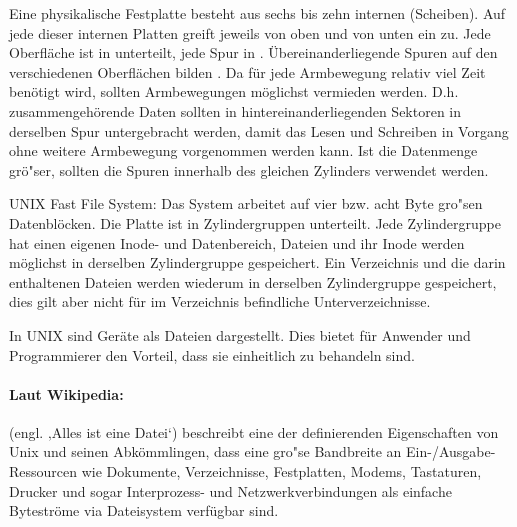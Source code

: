 \begin{answer}
  Eine physikalische Festplatte besteht aus sechs bis zehn internen  (Scheiben). Auf jede
  dieser internen Platten greift jeweils von oben und von unten ein  zu. Jede
  Oberfläche ist in  unterteilt, jede Spur in . Übereinanderliegende Spuren auf den
  verschiedenen Oberflächen bilden . Da für jede Armbewegung relativ viel Zeit benötigt
  wird, sollten Armbewegungen möglichst vermieden werden. D.h. zusammengehörende Daten sollten
  in hintereinanderliegenden Sektoren in derselben Spur untergebracht werden, damit das Lesen
  und Schreiben in Vorgang ohne weitere Armbewegung vorgenommen werden kann. Ist die Datenmenge
  grö"ser, sollten die Spuren innerhalb des gleichen Zylinders verwendet werden.

  UNIX Fast File System:
  Das System arbeitet auf vier bzw. acht Byte gro"sen Datenblöcken. Die Platte ist in Zylindergruppen unterteilt. Jede Zylindergruppe hat einen eigenen Inode- und Datenbereich, Dateien und ihr Inode werden möglichst in derselben Zylindergruppe gespeichert. Ein Verzeichnis und die darin enthaltenen Dateien werden wiederum in derselben Zylindergruppe gespeichert, dies gilt aber nicht für im Verzeichnis befindliche Unterverzeichnisse.
\end{answer}

\begin{answer}
  In UNIX sind Geräte als Dateien dargestellt. Dies bietet für Anwender und Programmierer den
  Vorteil, dass sie einheitlich zu behandeln sind.

  \paragraph*{Laut Wikipedia:}
   (engl. ‚Alles ist eine Datei‘) beschreibt eine der definierenden Eigenschaften von Unix und seinen Abkömmlingen, dass eine gro"se Bandbreite an Ein-/Ausgabe-Ressourcen wie Dokumente, Verzeichnisse, Festplatten, Modems, Tastaturen, Drucker und sogar Interprozess- und Netzwerkverbindungen als einfache Byteströme via Dateisystem verfügbar sind.
\end{answer}

